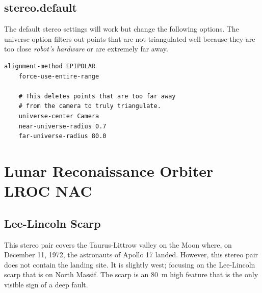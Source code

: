 \subsection*{stereo.default}

The default stereo settings will work but change the following
options. The universe option filters out points that are not
triangulated well because they are too close \emph{robot's hardware}
or are extremely far away.

\begin{center}\begin{minipage}{5.5in}
\begin{Verbatim}[frame=single,fontsize=\small,label=additional settings for MER]
    alignment-method EPIPOLAR
    force-use-entire-range

    # This deletes points that are too far away
    # from the camera to truly triangulate.
    universe-center Camera
    near-universe-radius 0.7
    far-universe-radius 80.0
\end{Verbatim}
\end{minipage}\end{center}

\clearpage
\section{Lunar Reconaissance Orbiter LROC NAC}

\subsection{Lee-Lincoln Scarp}

This stereo pair covers the Taurus-Littrow valley on the Moon where,
on December 11, 1972, the astronauts of Apollo 17 landed. However,
this stereo pair does not contain the landing site.  It is slightly
west; focusing on the Lee-Lincoln scarp that is on North Massif. The
scarp is an 80~m high feature that is the only visible sign of a deep
fault.

